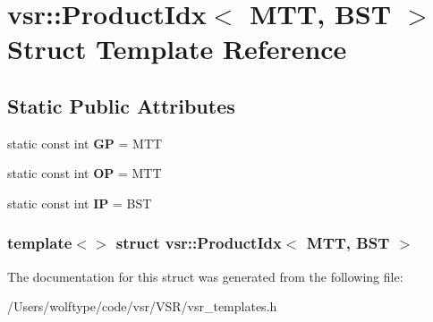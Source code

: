 \hypertarget{structvsr_1_1_product_idx_3_01_m_t_t_00_01_b_s_t_01_4}{\section{vsr\-:\-:Product\-Idx$<$ M\-T\-T, B\-S\-T $>$ Struct Template Reference}
\label{structvsr_1_1_product_idx_3_01_m_t_t_00_01_b_s_t_01_4}
}
\subsection*{Static Public Attributes}
\begin{DoxyCompactItemize}
\item 
\hypertarget{structvsr_1_1_product_idx_3_01_m_t_t_00_01_b_s_t_01_4_ac3fdd4f288a7255057a50471028a75e7}{static const int {\bfseries G\-P} = M\-T\-T}\label{structvsr_1_1_product_idx_3_01_m_t_t_00_01_b_s_t_01_4_ac3fdd4f288a7255057a50471028a75e7}

\item 
\hypertarget{structvsr_1_1_product_idx_3_01_m_t_t_00_01_b_s_t_01_4_ace847b23ed0b35538cf93d4c154a352e}{static const int {\bfseries O\-P} = M\-T\-T}\label{structvsr_1_1_product_idx_3_01_m_t_t_00_01_b_s_t_01_4_ace847b23ed0b35538cf93d4c154a352e}

\item 
\hypertarget{structvsr_1_1_product_idx_3_01_m_t_t_00_01_b_s_t_01_4_a490aff36c3eabd2ee04ce82c2280bd72}{static const int {\bfseries I\-P} = B\-S\-T}\label{structvsr_1_1_product_idx_3_01_m_t_t_00_01_b_s_t_01_4_a490aff36c3eabd2ee04ce82c2280bd72}

\end{DoxyCompactItemize}
\subsubsection*{template$<$$>$ struct vsr\-::\-Product\-Idx$<$ M\-T\-T, B\-S\-T $>$}



The documentation for this struct was generated from the following file\-:\begin{DoxyCompactItemize}
\item 
/\-Users/wolftype/code/vsr/\-V\-S\-R/vsr\-\_\-templates.\-h\end{DoxyCompactItemize}
